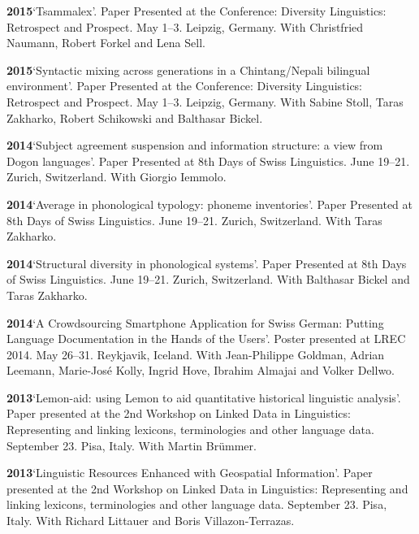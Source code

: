 \documentclass[11pt]{article}
\newcommand{\hangpara}{
 \setlength{\parindent}{0in} %
 \hangindent=0.42in %
}
\begin{document}
\vskip 6pt
\hangpara
{\bf 2015}\hspace{1ex}`Tsammalex'. Paper Presented at the Conference: Diversity Linguistics: Retrospect and Prospect. May 1--3. Leipzig, Germany. With Christfried Naumann, Robert Forkel and Lena Sell.

\vskip 6pt
\hangpara
{\bf 2015}\hspace{1ex}`Syntactic mixing across generations in a Chintang/Nepali bilingual environment'. Paper Presented at the Conference: Diversity Linguistics: Retrospect and Prospect. May 1--3. Leipzig, Germany. With Sabine Stoll, Taras Zakharko, Robert Schikowski and Balthasar Bickel.

\vskip 6pt
\hangpara
{\bf 2014}\hspace{1ex}`Subject agreement suspension and information structure: a view from Dogon languages'. Paper Presented at 8th Days of Swiss Linguistics. June 19--21. Zurich, Switzerland. With Giorgio Iemmolo.

\vskip 6pt
\hangpara
{\bf 2014}\hspace{1ex}`Average in phonological typology: phoneme inventories'. Paper Presented at 8th Days of Swiss Linguistics. June 19--21. Zurich, Switzerland. With Taras Zakharko.

\vskip 6pt
\hangpara
{\bf 2014}\hspace{1ex}`Structural diversity in phonological systems'. Paper Presented at 8th Days of Swiss Linguistics. June 19--21. Zurich, Switzerland. With Balthasar Bickel and Taras Zakharko.

\vskip 6pt
\hangpara
{\bf 2014}\hspace{1ex}`A Crowdsourcing Smartphone Application for Swiss German: Putting Language Documentation in the Hands of the Users'. Poster presented at LREC 2014. May 26--31. Reykjavik, Iceland. With Jean-Philippe Goldman, Adrian Leemann, Marie-Jos{\'e} Kolly, Ingrid Hove, Ibrahim Almajai and Volker Dellwo.

\vskip 6pt
\hangpara
{\bf 2013}\hspace{1ex}`Lemon-aid: using Lemon to aid quantitative historical linguistic analysis'. Paper presented at the 2nd Workshop on Linked Data in Linguistics: Representing and linking lexicons, terminologies and other language data. September 23. Pisa, Italy. With Martin Br{\"u}mmer. 

\vskip 6pt
\hangpara
{\bf 2013}\hspace{1ex}`Linguistic Resources Enhanced with Geospatial Information'. Paper presented at the 2nd Workshop on Linked Data in Linguistics: Representing and linking lexicons, terminologies and other language data. September 23. Pisa, Italy. With Richard Littauer and Boris Villazon-Terrazas.
\end{document}
